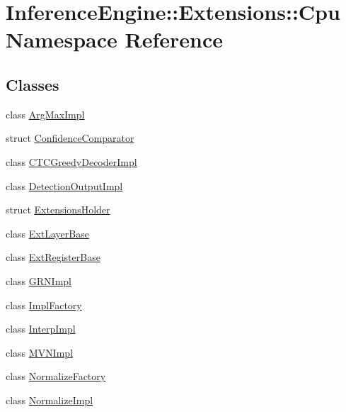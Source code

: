 \hypertarget{namespaceInferenceEngine_1_1Extensions_1_1Cpu}{}\section{Inference\+Engine\+:\+:Extensions\+:\+:Cpu Namespace Reference}
\label{namespaceInferenceEngine_1_1Extensions_1_1Cpu}
\subsection*{Classes}
\begin{DoxyCompactItemize}
\item 
class \hyperlink{classInferenceEngine_1_1Extensions_1_1Cpu_1_1ArgMaxImpl}{Arg\+Max\+Impl}
\item 
struct \hyperlink{structInferenceEngine_1_1Extensions_1_1Cpu_1_1ConfidenceComparator}{Confidence\+Comparator}
\item 
class \hyperlink{classInferenceEngine_1_1Extensions_1_1Cpu_1_1CTCGreedyDecoderImpl}{C\+T\+C\+Greedy\+Decoder\+Impl}
\item 
class \hyperlink{classInferenceEngine_1_1Extensions_1_1Cpu_1_1DetectionOutputImpl}{Detection\+Output\+Impl}
\item 
struct \hyperlink{structInferenceEngine_1_1Extensions_1_1Cpu_1_1ExtensionsHolder}{Extensions\+Holder}
\item 
class \hyperlink{classInferenceEngine_1_1Extensions_1_1Cpu_1_1ExtLayerBase}{Ext\+Layer\+Base}
\item 
class \hyperlink{classInferenceEngine_1_1Extensions_1_1Cpu_1_1ExtRegisterBase}{Ext\+Register\+Base}
\item 
class \hyperlink{classInferenceEngine_1_1Extensions_1_1Cpu_1_1GRNImpl}{G\+R\+N\+Impl}
\item 
class \hyperlink{classInferenceEngine_1_1Extensions_1_1Cpu_1_1ImplFactory}{Impl\+Factory}
\item 
class \hyperlink{classInferenceEngine_1_1Extensions_1_1Cpu_1_1InterpImpl}{Interp\+Impl}
\item 
class \hyperlink{classInferenceEngine_1_1Extensions_1_1Cpu_1_1MVNImpl}{M\+V\+N\+Impl}
\item 
class \hyperlink{classInferenceEngine_1_1Extensions_1_1Cpu_1_1NormalizeFactory}{Normalize\+Factory}
\item 
class \hyperlink{classInferenceEngine_1_1Extensions_1_1Cpu_1_1NormalizeImpl}{Normalize\+Impl}
\item 

\end{DoxyCompactItemize}
